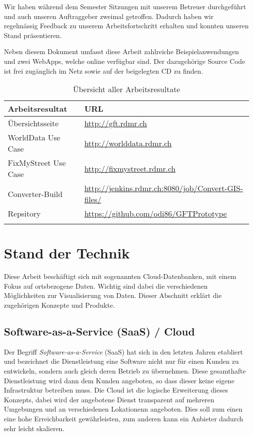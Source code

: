 Wir haben während dem Semester Sitzungen mit unserem Betreuer durchgeführt und auch unseren Auftraggeber zweimal getroffen. Dadurch haben wir regelmässig Feedback zu unserem Arbeitsfortschritt erhalten und konnten unseren Stand präsentieren.

Neben diesem Dokument umfasst diese Arbeit zahlreiche Beispielanwendungen und zwei WebApps, welche online verfügbar sind. Der dazugehörige Source Code ist frei zugänglich im Netz sowie auf der beigelegten CD zu finden.

\begin{longtable}{|l|l|}
\hline 
\textbf{Arbeitsresultat} & \textbf{URL} \\ 
\hline 
Übersichtsseite & \url{http://gft.rdmr.ch} \\ 
\hline 
WorldData Use Case & \url{http://worlddata.rdmr.ch} \\ 
\hline 
FixMyStreet Use Case & \url{http://fixmystreet.rdmr.ch} \\ 
\hline 
Converter-Build & \url{http://jenkins.rdmr.ch:8080/job/Convert-GIS-files/} \\ 
\hline 
Repsitory & \url{https://github.com/odi86/GFTPrototype} \\ 
\hline 
\caption{Übersicht aller Arbeitsresultate}
\label{arbeitsresultate}
\end{longtable} 

\section{Stand der Technik}
Diese Arbeit beschäftigt sich mit sogenannten \gls{Cloud}-Datenbanken, mit einem Fokus auf ortsbezogene Daten. Wichtig sind dabei die verschiedenen Möglichkeiten zur Visualisierung von Daten. Dieser Abschnitt erklärt die zugehörigen Konzepte und Produkte.

\subsection{Software-as-a-Service (SaaS) / Cloud}
Der Begriff \emph{Software-as-a-Service} (SaaS) hat sich in den letzten Jahren etabliert und bezeichnet die Dienstleistung eine Software nicht nur für einen Kunden zu entwickeln, sondern auch gleich deren Betrieb zu übernehmen. Diese gesamthafte Dienstleistung wird dann dem Kunden angeboten, so dass dieser keine eigene Infrastruktur betreiben muss. Die \gls{Cloud} ist die logische  Erweiterung dieses Konzepts, dabei wird der angebotene Dienst transparent auf mehreren Umgebungen und an verschiedenen Lokationenn angeboten. Dies soll zum einen eine hohe Erreichbarkeit gewährleisten, zum anderen kann ein Anbieter dadurch sehr leicht skalieren.\cite{cloud}

